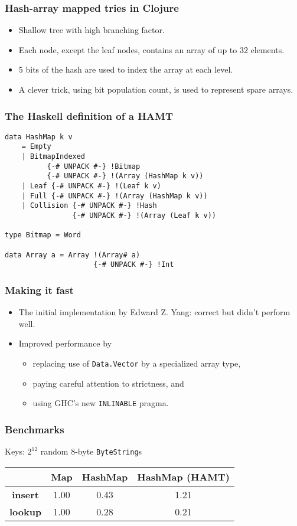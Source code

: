 \documentclass{beamer}
\begin{document}
\begin{frame}
  \frametitle{Hash-array mapped tries in Clojure}
  \begin{itemize}
  \item Shallow tree with high branching factor.
  \item Each node, except the leaf nodes, contains an array of up to
    32 elements.
  \item 5 bits of the hash are used to index the array at each level.
  \item A clever trick, using bit population count, is used to
    represent spare arrays.
  \end{itemize}
\end{frame}

\begin{frame}[fragile]
  \frametitle{The Haskell definition of a HAMT}
  \begin{lstlisting}
data HashMap k v
    = Empty
    | BitmapIndexed
          {-# UNPACK #-} !Bitmap
          {-# UNPACK #-} !(Array (HashMap k v))
    | Leaf {-# UNPACK #-} !(Leaf k v)
    | Full {-# UNPACK #-} !(Array (HashMap k v))
    | Collision {-# UNPACK #-} !Hash
                {-# UNPACK #-} !(Array (Leaf k v))

type Bitmap = Word

data Array a = Array !(Array# a)
                     {-# UNPACK #-} !Int
  \end{lstlisting}
\end{frame}

\begin{frame}
  \frametitle{Making it fast}
  \begin{itemize}
  \item The initial implementation by Edward Z. Yang: correct but
    didn't perform well.
    \item Improved performance by
      \begin{itemize}
        \item replacing use of \lstinline!Data.Vector! by a
          specialized array type,
        \item paying careful attention to strictness, and
        \item using GHC's new \texttt{INLINABLE} pragma.
      \end{itemize}
  \end{itemize}
\end{frame}

\begin{frame}
  \frametitle{Benchmarks}

  Keys: $2^{12}$ random 8-byte \lstinline!ByteString!s

  \bigskip
  \begin{tabular}{|c|c|c|c|}
    \hline  & \textbf{Map} & \textbf{HashMap} &
    \textbf{HashMap (HAMT)} \\
    \hline \textbf{insert} & 1.00 & 0.43 & 1.21 \\
    \hline \textbf{lookup} & 1.00 & 0.28 & 0.21 \\
    \hline
  \end{tabular}
\end{frame}
\end{document}

